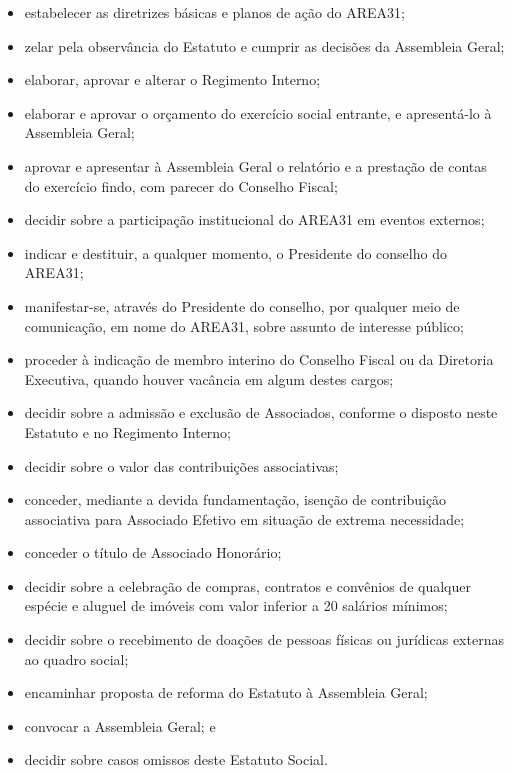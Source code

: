 \begin{itemize}
    \item estabelecer as diretrizes básicas e planos de ação do AREA31;
    \item zelar pela observância do Estatuto e cumprir as decisões da 
        Assembleia Geral;
    \item elaborar, aprovar e alterar o Regimento Interno;
    \item elaborar e aprovar o orçamento do exercício social entrante, 
        e apresentá-lo à Assembleia Geral;
    \item aprovar e apresentar à Assembleia Geral o relatório e a prestação 
        de contas do exercício findo, com parecer do Conselho Fiscal;
    \item decidir sobre a participação institucional do AREA31 
        em eventos externos;
    \item indicar e destituir, a qualquer momento, o Presidente do 
        conselho do AREA31;
    \item manifestar-se, através do Presidente do conselho, por qualquer meio 
        de comunicação, em nome do AREA31, sobre assunto de interesse público;
    \item proceder à indicação de membro interino do Conselho Fiscal ou da 
        Diretoria Executiva, quando houver vacância em algum destes cargos;
    \item decidir sobre a admissão e exclusão de Associados, conforme o 
        disposto neste Estatuto e no Regimento Interno;
    \item decidir sobre o valor das contribuições associativas;
    \item conceder, mediante a devida fundamentação, isenção de contribuição 
        associativa para Associado Efetivo em situação de extrema necessidade;
    \item conceder o título de Associado Honorário;
    \item decidir sobre a celebração de compras, contratos e convênios de 
        qualquer espécie e aluguel de imóveis com valor inferior a 
        20 salários mínimos;
    \item decidir sobre o recebimento de doações de pessoas físicas ou 
        jurídicas externas ao quadro social;
    \item encaminhar proposta de reforma do Estatuto à Assembleia Geral;
    \item convocar a Assembleia Geral; e
    \item decidir sobre casos omissos deste Estatuto Social.
\end{itemize}

